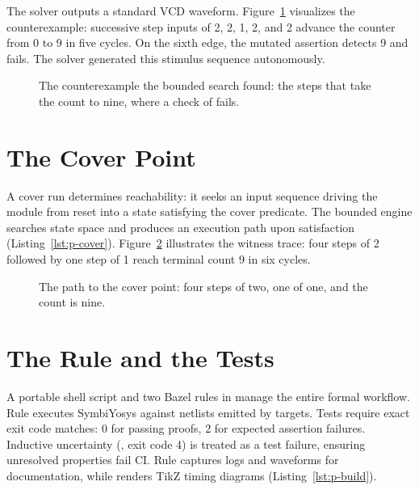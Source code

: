 \documentclass[journal,9pt]{IEEEtran}
\begin{document}
The solver outputs a standard VCD waveform. Figure~\ref{fig:p-cex} visualizes
the counterexample: successive step inputs of 2, 2, 1, 2, and 2 advance the
counter from 0 to 9 in five cycles. On the sixth edge, the mutated assertion
detects 9 and fails. The solver generated this stimulus sequence autonomously.

\begin{figure}[htbp]
\centering

\caption{The counterexample the bounded search found: the steps that
take the count to nine, where a check of  fails.}
\label{fig:p-cex}
\end{figure}

\section{The Cover Point}
\label{sec:p-cover}

A cover run determines reachability: it seeks an input sequence driving the
module from reset into a state satisfying the cover predicate. The bounded
engine searches state space and produces an execution path upon satisfaction
(Listing~\ref{lst:p-cover}). Figure~\ref{fig:p-reach} illustrates the witness
trace: four steps of 2 followed by one step of 1 reach terminal count 9 in six
cycles.



\begin{figure}[htbp]
\centering

\caption{The path to the cover point: four steps of two, one of one,
and the count is nine.}
\label{fig:p-reach}
\end{figure}

\section{The Rule and the Tests}
\label{sec:p-rule}

A portable shell script and two Bazel rules in  manage the
entire formal workflow. Rule  executes SymbiYosys against
netlists emitted by  targets. Tests require exact exit code
matches: 0 for passing proofs, 2 for expected assertion failures. Inductive
uncertainty (, exit code 4) is treated as a test failure, ensuring
unresolved properties fail CI. Rule  captures logs and
waveforms for documentation, while  renders TikZ timing
diagrams (Listing~\ref{lst:p-build}).
\end{document}
